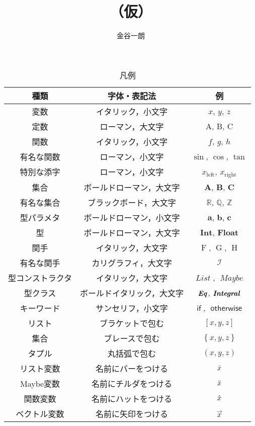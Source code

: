 \documentclass[a5paper,draft]{jsbook}
\title{\haskell （仮）}
\author{金谷一朗}
\newcommand{\mathConstant}[1]{\mathrm{#1}} %
\newcommand{\mathSub}[1]{\textrm{#1}}
\newcommand{\mathSet}[1]{\mathbf{#1}} %
\newcommand{\mathSpecialSet}[1]{\mathbb{#1}} %
\newcommand{\mathTypeParameter}[1]{\mathbf{#1}}
\newcommand{\mathTypeName}[1]{\textbf{#1}}
\newcommand{\mathFunctor}[1]{\mathop{#1}} %
\newcommand{\mathSpecialFunctor}[1]{\mathcal{#1}} %
\newcommand{\mathTypeConstructor}[1]{\textit{#1}} %
\newcommand{\mathTypeClass}[1]{\textbf{\emph{#1}}} %
\newcommand{\mathListWith}[1]{\left[#1\right]}
\newcommand{\mathSetWith}[1]{\left\{#1\right\}}
\newcommand{\mathTupleWith}[1]{\left(#1\right)}
\newcommand{\mathListVar}[1]{\Bar{#1}}
\newcommand{\mathMaybeVar}[1]{\Tilde{#1}}
\newcommand{\mathFunctionVar}[1]{\Hat{#1}}
\newcommand{\mathVectorVar}[1]{\vec{#1}}
\DeclareMathOperator{\mathList}{\mathTypeConstructor{List}}
\DeclareMathOperator{\mathMaybe}{\mathTypeConstructor{Maybe}}
\newcommand{\mathLeft}{\mathSub{left}}
\newcommand{\mathRight}{\mathSub{right}}
\newcommand{\mathSpecialFunction}[1]{\operatorname{\mathrm{#1}}}
\newcommand{\mathFirst}{\mathSpecialFunction{first}}
\newcommand{\mathRest}{\mathSpecialFunction{rest}}
\newcommand{\mathKeyword}[1]{\operatorname{\textsf{#1}}}
\newcommand{\mathIf}{\mathKeyword{if}}
\newcommand{\mathOtherwise}{\mathKeyword{otherwise}}
\begin{document}
\setlength{\baselineskip}{17pt}
\maketitle
\tableofcontents

\begin{table*}[p]
\caption{凡例}
\begin{center}
\begin{tabular}{||c|c|c||}
\hline
種類&字体・表記法&例\\
\hline\hline
変数&イタリック，小文字&$x$, $y$, $z$\\
定数&ローマン，大文字&$\mathConstant{A}$, $\mathConstant{B}$, $\mathConstant{C}$\\
関数&イタリック，小文字&$f$, $g$, $h$\\
有名な関数&ローマン，小文字&$\sin$, $\cos$, $\tan$\\
特別な添字&ローマン，小文字&$x_\mathLeft$, $x_\mathRight$\\
\hline
集合&ボールドローマン，大文字&$\mathSet{A}$, $\mathSet{B}$, $\mathSet{C}$\\
有名な集合&ブラックボード，大文字&$\mathSpecialSet{R}$, $\mathSpecialSet{Q}$, $\mathSpecialSet{Z}$\\
型パラメタ&ボールドローマン，小文字&$\mathTypeParameter{a}$, $\mathTypeParameter{b}$, $\mathTypeParameter{c}$\\
型&ボールドローマン，大文字&$\mathTypeName{Int}$, $\mathTypeName{Float}$\\
\hline
関手&イタリック，大文字&$\mathFunctor{F}$, $\mathFunctor{G}$, $\mathFunctor{H}$\\
有名な関手&カリグラフィ，大文字&$\mathSpecialFunctor{I}$\\
型コンストラクタ&イタリック，大文字&$\mathList$, $\mathMaybe$\\
型クラス&ボールドイタリック，大文字&$\mathTypeClass{Eq}$, $\mathTypeClass{Integral}$\\
\hline
キーワード&サンセリフ，小文字&$\mathIf$, $\mathOtherwise$\\
\hline
リスト&ブラケットで包む&$\mathListWith{x,y,z}$\\
集合&ブレースで包む&$\mathSetWith{x,y,z}$\\
タプル&丸括弧で包む&$\mathTupleWith{x,y,z}$\\
\hline
リスト変数&名前にバーをつける&$\mathListVar{x}$\\
Maybe変数&名前にチルダをつける&$\mathMaybeVar{x}$\\
関数変数&名前にハットをつける&$\mathFunctionVar{x}$\\
ベクトル変数&名前に矢印をつける&$\mathVectorVar{x}$\\
\hline
\end{tabular}
\end{center}
\end{table*}
\end{document}
